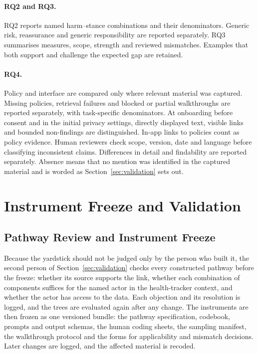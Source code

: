 \paragraph{RQ2 and RQ3.} RQ2 reports named harm--stance combinations and their denominators.
Generic risk, reassurance and generic responsibility are reported separately. RQ3 summarises
measures, scope, strength and reviewed mismatches. Examples that both support and challenge the
expected gap are retained.

\paragraph{RQ4.} Policy and interface are compared only where relevant material was captured.
Missing policies, retrieval failures and blocked or partial walkthroughs are reported
separately, with task-specific denominators. At onboarding before consent and in the initial
privacy settings, directly displayed text, visible links and bounded non-findings are
distinguished. In-app links to policies count as policy evidence. Human reviewers check scope,
version, date and language before classifying inconsistent claims. Differences in detail and
findability are reported separately. Absence means that no mention was identified in the
captured material and is worded as Section~\ref{sec:validation} sets out.

\section{Instrument Freeze and Validation}
\label{sec:instruments}

\subsection{Pathway Review and Instrument Freeze}
\label{sec:freeze}
Because the yardstick should not be judged only by the person who built it, the second person of
Section~\ref{sec:validation} checks every constructed pathway before the freeze: whether its
source supports the link, whether each combination of components suffices for the named actor in
the health-tracker context, and whether the actor has access to the data. Each objection and its
resolution is logged, and the trees are evaluated again after any change. The instruments are
then frozen as one versioned bundle: the pathway specification, codebook, prompts and output
schemas, the human coding sheets, the sampling manifest, the walkthrough protocol and the forms
for applicability and mismatch decisions. Later changes are logged, and the affected material is
recoded.

